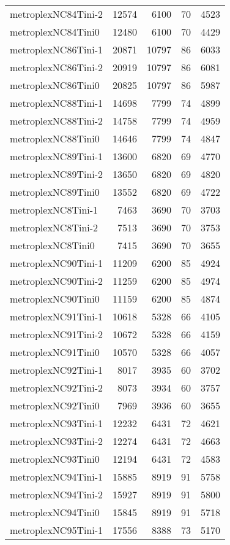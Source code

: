 \documentclass[../../../thesis.tex]{subfiles}
\begin{document}
\begin{longtable}{lrrrr}
metroplexNC84Tini-2 & 12574 & 6100 & 70 & 4523 \\
metroplexNC84Tini0 & 12480 & 6100 & 70 & 4429 \\
metroplexNC86Tini-1 & 20871 & 10797 & 86 & 6033 \\
metroplexNC86Tini-2 & 20919 & 10797 & 86 & 6081 \\
metroplexNC86Tini0 & 20825 & 10797 & 86 & 5987 \\
metroplexNC88Tini-1 & 14698 & 7799 & 74 & 4899 \\
metroplexNC88Tini-2 & 14758 & 7799 & 74 & 4959 \\
metroplexNC88Tini0 & 14646 & 7799 & 74 & 4847 \\
metroplexNC89Tini-1 & 13600 & 6820 & 69 & 4770 \\
metroplexNC89Tini-2 & 13650 & 6820 & 69 & 4820 \\
metroplexNC89Tini0 & 13552 & 6820 & 69 & 4722 \\
metroplexNC8Tini-1 & 7463 & 3690 & 70 & 3703 \\
metroplexNC8Tini-2 & 7513 & 3690 & 70 & 3753 \\
metroplexNC8Tini0 & 7415 & 3690 & 70 & 3655 \\
metroplexNC90Tini-1 & 11209 & 6200 & 85 & 4924 \\
metroplexNC90Tini-2 & 11259 & 6200 & 85 & 4974 \\
metroplexNC90Tini0 & 11159 & 6200 & 85 & 4874 \\
metroplexNC91Tini-1 & 10618 & 5328 & 66 & 4105 \\
metroplexNC91Tini-2 & 10672 & 5328 & 66 & 4159 \\
metroplexNC91Tini0 & 10570 & 5328 & 66 & 4057 \\
metroplexNC92Tini-1 & 8017 & 3935 & 60 & 3702 \\
metroplexNC92Tini-2 & 8073 & 3934 & 60 & 3757 \\
metroplexNC92Tini0 & 7969 & 3936 & 60 & 3655 \\
metroplexNC93Tini-1 & 12232 & 6431 & 72 & 4621 \\
metroplexNC93Tini-2 & 12274 & 6431 & 72 & 4663 \\
metroplexNC93Tini0 & 12194 & 6431 & 72 & 4583 \\
metroplexNC94Tini-1 & 15885 & 8919 & 91 & 5758 \\
metroplexNC94Tini-2 & 15927 & 8919 & 91 & 5800 \\
metroplexNC94Tini0 & 15845 & 8919 & 91 & 5718 \\
metroplexNC95Tini-1 & 17556 & 8388 & 73 & 5170 \\

\end{longtable}
\end{document}
